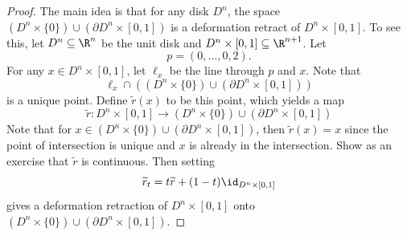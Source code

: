\begin{proof}
  The main idea is that for any disk $D^n$, the space
  $(D^n \times \{0\}) \cup (\partial D^n \times [0, 1])$
  is a deformation retract of $D^n \times [0, 1]$.
  To see this, let $D^n \subseteq \R^n$ be the unit
  disk and $D^n \times [0, 1] \subseteq \R^{n + 1}$.
  Let
  \[
    p = (0, \dots, 0, 2).
  \]
  For any $x \in D^n \times [0, 1]$, let
  $\ell_x$ be the line through $p$ and $x$. Note that
  \[
    \ell_x \cap ((D^n \times \{0\}) \cup (\partial D^n \times [0, 1]))
  \]
  is a unique point. Define $\widetilde{r}(x)$ to be this point,
  which yields a map
  \[\widetilde{r} : D^n \times [0, 1] \to (D^n \times \{0\}) \cup (\partial D^n \times [0, 1])\]
  Note that for $x \in (D^n \times \{0\}) \cup (\partial D^n \times [0, 1])$,
  then $\widetilde{r}(x) = x$ since the point of intersection is
  unique and $x$ is already in the intersection.
  Show as an exercise that $\widetilde{r}$ is continuous.
  Then setting
  \[
    \widetilde{r}_t = t \widetilde{r} + (1 - t) \id_{D^n \times [0, 1]}
  \]
  gives a deformation retraction
  of $D^n \times [0, 1]$ onto
  $(D^n \times \{0\}) \cup (\partial D^n \times [0, 1])$.


\end{proof}
